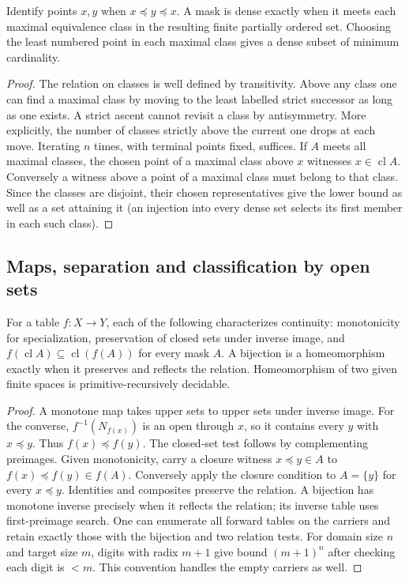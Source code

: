 \begin{proposition}\label{idx-finite114}
Identify points $x,y$ when $x\preceq y\preceq x$. A mask is dense exactly
when it meets each maximal equivalence class in the resulting finite
partially ordered set. Choosing the least numbered point in each maximal
class gives a dense subset of minimum cardinality.
\end{proposition}
\begin{proof}
The relation on classes is well defined by transitivity. Above any class
one can find a maximal class by moving to the least labelled strict
successor as long as one exists. A strict ascent cannot revisit a class
by antisymmetry. More explicitly, the number of classes strictly above
the current one drops at each move. Iterating $n$ times, with terminal
points fixed, suffices. If $A$ meets all maximal classes, the chosen
point of a maximal class above $x$ witnesses $x\in\operatorname{cl}A$.
Conversely a witness above a point of a maximal class must belong to that
class. Since the classes are disjoint, their chosen representatives give
the lower bound as well as a set attaining it (an injection into every
dense set selects its first member in each such class).
\end{proof}

\subsection{Maps, separation and classification by open sets}

\begin{theorem}\label{idx-finite136}
For a table $f:X\to Y$, each of the following characterizes continuity:
monotonicity for specialization, preservation of closed sets under inverse
image, and $f(\operatorname{cl}A)\subseteq\operatorname{cl}(f(A))$ for
every mask $A$. A bijection is a homeomorphism exactly when it preserves
and reflects the relation. Homeomorphism of two given finite spaces is
primitive-recursively decidable.
\end{theorem}
\begin{proof}
A monotone map takes upper sets to upper sets under inverse image. For the
converse, $f^{-1}(N_{f(x)})$ is an open through $x$, so it contains every
$y$ with $x\preceq y$. Thus $f(x)\preceq f(y)$. The closed-set test follows
by complementing preimages. Given monotonicity, carry a closure witness
$x\preceq y\in A$ to $f(x)\preceq f(y)\in f(A)$. Conversely apply the
closure condition to $A=\{y\}$ for every $x\preceq y$. Identities and
composites preserve the relation. A bijection has monotone inverse precisely
when it reflects the relation; its inverse table uses first-preimage search.
One can enumerate all forward tables on the carriers and retain exactly
those with the bijection and two relation tests. For domain size $n$ and
target size $m$, digits with radix $m+1$ give bound $(m+1)^n$ after checking
each digit is $<m$. This convention handles the empty carriers as well.
\end{proof}

